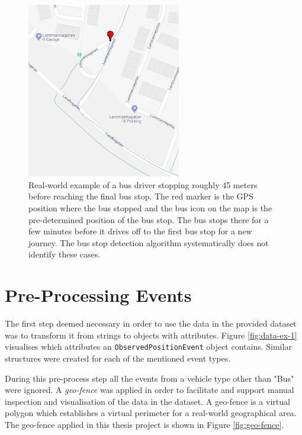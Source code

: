 \begin{figure}[t!]
    \centering
    \includegraphics[width=0.6\textwidth]{figures/stopped_before_end}
    \caption{Real-world example of a bus driver stopping roughly 45 meters before reaching the final bus stop.
    The red marker is the GPS position where the bus stopped and the bus icon on the map is the pre-determined position of the bus stop.
    The bus stops there for a few minutes before it drives off to the first bus stop for a new journey.
    The bus stop detection algorithm systematically does not identify these cases.}
    \label{fig:stopped-before-end}
\end{figure}

\section{Pre-Processing Events}
The first step deemed necessary in order to use the data in the provided dataset was to transform it from strings to objects with attributes.
Figure \ref{fig:data-ex-1} visualises which attributes an \texttt{ObservedPositionEvent} object contains.
Similar structures were created for each of the mentioned event types.

During this pre-process step all the events from a vehicle type other than "Bus" were ignored.
A \textit{geo-fence} was applied in order to facilitate and support manual inspection and visualisation of the data in the dataset.
A geo-fence is a virtual polygon which establishes a virtual perimeter for a real-world geographical area.
The geo-fence applied in this thesis project is shown in Figure \ref{fig:geo-fence}.

